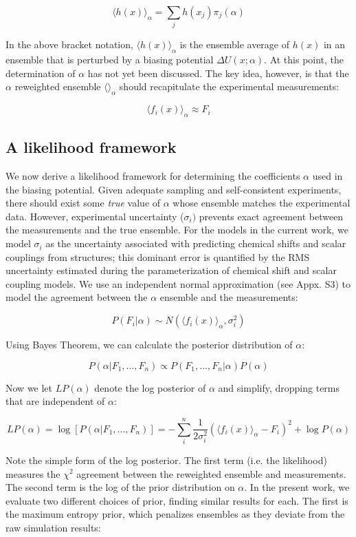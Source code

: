 \documentclass[journal=jacsat,manuscript=article]{achemso}
\begin{document}
$$\langle h(x)\rangle _\alpha = \sum_j h(x_j) \pi_j(\alpha)$$

In the above bracket notation, $\langle h(x)\rangle _\alpha$ is the ensemble average of $h(x)$ in an ensemble that is perturbed by a biasing potential $\Delta U(x;\alpha)$.  At this point, the determination of $\alpha$ has not yet been discussed.  The key idea, however, is that the $\alpha$ reweighted ensemble $\langle \rangle _\alpha$ should recapitulate the experimental measurements:

$$\langle f_i(x)\rangle _\alpha \approx F_i$$


\subsection{A likelihood framework}

We now derive a likelihood framework for determining the coefficients $\alpha$ used in the biasing potential.  Given adequate sampling and self-consistent experiments, there should exist some \emph{true} value of $\alpha$ whose ensemble matches the experimental data.  However, experimental uncertainty ($\sigma_i)$ prevents exact agreement between the measurements and the true ensemble.  For the models in the current work, we model $\sigma_i$ as the uncertainty associated with predicting chemical shifts and scalar couplings from structures; this dominant error is quantified by the RMS uncertainty estimated during the parameterization of chemical shift and scalar coupling models.  We use an independent normal approximation (see Appx. S3) to model the agreement between the $\alpha$ ensemble and the measurements:

$$P(F_i | \alpha) \sim N(\langle f_i(x)\rangle _\alpha, \sigma_i^2)$$

Using Bayes Theorem, we can calculate the posterior distribution of $\alpha$:

$$P(\alpha | F_1, ..., F_n) \propto P(F_1, ..., F_n | \alpha) P(\alpha)$$

Now we let $LP(\alpha)$ denote the log posterior of $\alpha$ and simplify, dropping terms that are independent of $\alpha$:

$$LP(\alpha) = \log[ P(\alpha|F_1, ..., F_n)] = -\sum_i^n \frac{1}{2\sigma_i^2}(\langle f_i(x)\rangle _\alpha - F_i)^2 + \log P(\alpha)$$

Note the simple form of the log posterior.  The first term (i.e. the likelihood) measures the $\chi^2$ agreement between the reweighted ensemble and measurements.  The second term is the log of the prior distribution on $\alpha$.  In the present work, we evaluate two different choices of prior, finding similar results for each.  The first is the maximum entropy prior, which penalizes ensembles as they deviate from the raw simulation results:
\end{document}
